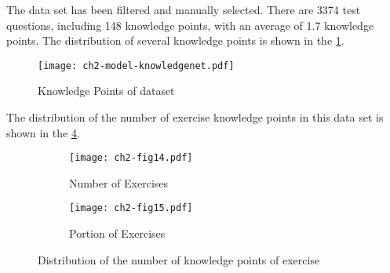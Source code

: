 The data set has been filtered and manually selected. There are 3374 test questions, including 148 knowledge points, with an average of 1.7 knowledge points. The distribution of several knowledge points is shown in the \figurename{\ref{fig:ch2-model-knowledgenet}}.
\begin{figure}[htbp!]
	\centering
	\texttt{[image: ch2-model-knowledgenet.pdf]}
	\caption{Knowledge Points of dataset}\label{fig:ch2-model-knowledgenet}
\end{figure}

The distribution of the number of exercise knowledge points in this data set is shown in the \figurename{\ref{ch2-fig14}}.
\begin{figure}[htbp!]
	\centering
	\begin{subfigure}[b]{0.475\textwidth}
		\texttt{[image: ch2-fig14.pdf]}
		\caption[dis]{Number of Exercises}\label{fig:ch2-fig14-hist}
	\end{subfigure}
	\begin{subfigure}[b]{0.475\textwidth}
		\texttt{[image: ch2-fig15.pdf]}
		\caption{Portion of Exercises}\label{fig:ch2-fig14-pie}
	\end{subfigure}
	\caption{Distribution of the number of knowledge points of exercise}\label{ch2-fig14}
\end{figure}


